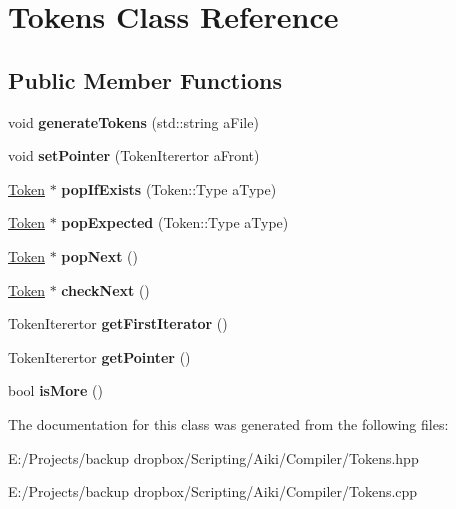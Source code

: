 \hypertarget{a00026}{\section{Tokens Class Reference}
\label{a00026}
}
\subsection*{Public Member Functions}
\begin{DoxyCompactItemize}
\item 
\hypertarget{a00026_a60ba2f31bd640b06347b2b05e0c49bce}{void {\bfseries generate\+Tokens} (std\+::string a\+File)}\label{a00026_a60ba2f31bd640b06347b2b05e0c49bce}

\item 
\hypertarget{a00026_a3937c350677be513f8fae9bb039b5048}{void {\bfseries set\+Pointer} (Token\+Iterertor a\+Front)}\label{a00026_a3937c350677be513f8fae9bb039b5048}

\item 
\hypertarget{a00026_ac77fef2bf79930113c4a0ee184574924}{\hyperlink{a00025}{Token} $\ast$ {\bfseries pop\+If\+Exists} (Token\+::\+Type a\+Type)}\label{a00026_ac77fef2bf79930113c4a0ee184574924}

\item 
\hypertarget{a00026_a9c3df0010d1c782ac84e8124d8b504d6}{\hyperlink{a00025}{Token} $\ast$ {\bfseries pop\+Expected} (Token\+::\+Type a\+Type)}\label{a00026_a9c3df0010d1c782ac84e8124d8b504d6}

\item 
\hypertarget{a00026_a25d0c3de304ab05f23855c512e8e15f6}{\hyperlink{a00025}{Token} $\ast$ {\bfseries pop\+Next} ()}\label{a00026_a25d0c3de304ab05f23855c512e8e15f6}

\item 
\hypertarget{a00026_a1b7b5a9cc72ab57874c90ab8feb10934}{\hyperlink{a00025}{Token} $\ast$ {\bfseries check\+Next} ()}\label{a00026_a1b7b5a9cc72ab57874c90ab8feb10934}

\item 
\hypertarget{a00026_a4cb230238fa3fa1ac0586b8289b3b666}{Token\+Iterertor {\bfseries get\+First\+Iterator} ()}\label{a00026_a4cb230238fa3fa1ac0586b8289b3b666}

\item 
\hypertarget{a00026_ab35f81cfa85c12e184ead391d4c6bdbd}{Token\+Iterertor {\bfseries get\+Pointer} ()}\label{a00026_ab35f81cfa85c12e184ead391d4c6bdbd}

\item 
\hypertarget{a00026_a9531391ac07caf1f8df162d7e2660b62}{bool {\bfseries is\+More} ()}\label{a00026_a9531391ac07caf1f8df162d7e2660b62}

\end{DoxyCompactItemize}


The documentation for this class was generated from the following files\+:\begin{DoxyCompactItemize}
\item 
E\+:/\+Projects/backup dropbox/\+Scripting/\+Aiki/\+Compiler/Tokens.\+hpp\item 
E\+:/\+Projects/backup dropbox/\+Scripting/\+Aiki/\+Compiler/Tokens.\+cpp\end{DoxyCompactItemize}
